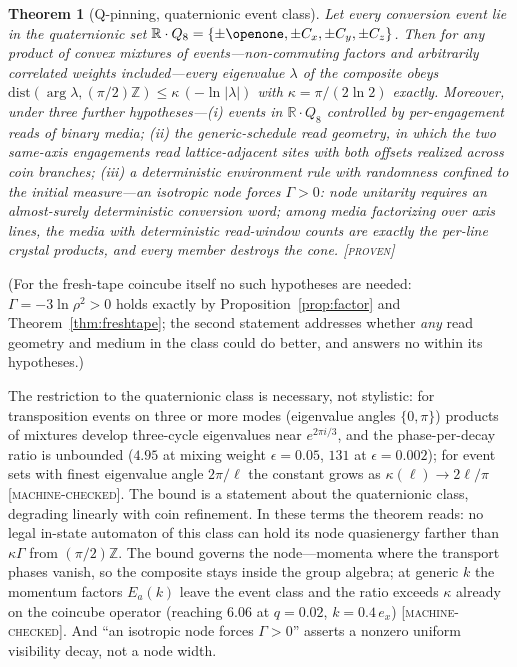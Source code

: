 \documentclass[aps,prd,twocolumn,superscriptaddress,nofootinbib,floatfix]{revtex4-2}
\newtheorem{theorem}{Theorem}
\newcommand{\evP}{\textnormal{\textsc{[proven]}}}
\newcommand{\evM}{\textnormal{\textsc{[machine-checked]}}}
\begin{document}
\begin{theorem}[Q-pinning, quaternionic event class]\label{thm:qbound}
Let every conversion event lie in the quaternionic set
$\mathbb R\cdot Q_8=\{\pm\openone,\pm C_x,\pm C_y,\pm C_z\}$. Then for
any product of convex mixtures of events---non-commuting factors and
arbitrarily correlated weights included---every eigenvalue $\lambda$ of
the composite obeys
$\mathrm{dist}(\arg\lambda,(\pi/2)\mathbb Z)\le\kappa\,(-\ln|\lambda|)$
with $\kappa=\pi/(2\ln2)$ exactly. Moreover, under three further
hypotheses---(i) events in $\mathbb R\cdot Q_8$ controlled by
per-engagement reads of binary media; (ii) the generic-schedule read
geometry, in which the two same-axis engagements read lattice-adjacent
sites with both offsets realized across coin branches; (iii) a
deterministic
environment rule with randomness confined to the initial measure---an
isotropic node forces $\Gamma>0$: node unitarity requires an
almost-surely deterministic conversion word; among media factorizing
over axis lines, the media with deterministic read-window counts are
exactly the per-line crystal products, and every member destroys the
cone. \evP{}
\end{theorem}

(For the fresh-tape coincube itself no such hypotheses are needed:
$\Gamma=-3\ln\rho^2>0$ holds exactly by Proposition~\ref{prop:factor}
and Theorem~\ref{thm:freshtape}; the second statement addresses whether
\emph{any} read geometry and medium in the class could do better, and
answers no within its hypotheses.)

The restriction to the quaternionic class is necessary, not stylistic:
for transposition events on three or more modes (eigenvalue angles
$\{0,\pi\}$) products of mixtures develop three-cycle eigenvalues near
$e^{2\pi i/3}$, and the phase-per-decay ratio is unbounded ($4.95$ at
mixing weight $\epsilon=0.05$, $131$ at $\epsilon=0.002$); for event
sets with finest eigenvalue angle $2\pi/\ell$ the constant grows as
$\kappa(\ell)\to2\ell/\pi$ \evM{}. The bound is a statement about the
quaternionic class, degrading linearly with coin refinement. In these
terms the theorem reads: no legal in-state automaton of this class can
hold its node quasienergy farther than $\kappa\Gamma$ from
$(\pi/2)\mathbb Z$. The bound governs the node---momenta where the
transport phases vanish, so the composite stays inside the group
algebra; at generic $k$ the momentum factors $E_a(k)$ leave the event
class and the ratio exceeds $\kappa$ already on the coincube operator
(reaching $6.06$ at $q=0.02$, $k=0.4\,e_x$) \evM{}. And ``an isotropic
node forces $\Gamma>0$'' asserts a nonzero uniform visibility decay,
not a node width.
\end{document}
